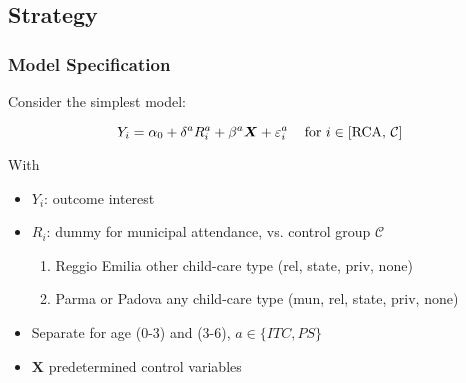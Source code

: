 \subsection{Strategy}

\begin{frame} \frametitle{Model Specification}
Consider the simplest model:

\begin{equation}
Y_{i} = \alpha_0 + \delta^{a} R_{i}^{a} + \beta^{a} \boldsymbol{X} + \varepsilon_{i}^{a}    \hspace{2ex} \text{ for } i \in [\text{RCA, } \mathcal{C}]\label{eq1:OLSreggio}
\end{equation}


With 
\begin{itemize}
	\item $Y_{i}$: outcome interest
	\item $R_{i}$: dummy for municipal attendance, vs. control group $\mathcal{C}$
	\begin{enumerate}
		\item Reggio Emilia \hfill {\scriptsize other child-care type (rel, state, priv, none)}
		\item Parma or Padova \hfill {\scriptsize any child-care type (mun, rel, state, priv, none)}
	\end{enumerate}
	\item Separate for age (0-3) and (3-6), $a \in \{ITC,PS\}$ %
	\item $\boldsymbol{X}$ predetermined control variables

\end{itemize}

\end{frame}

